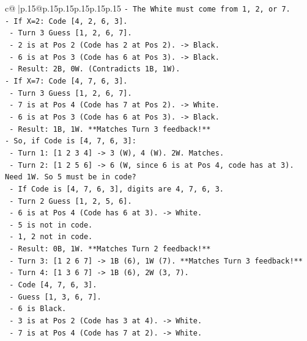 \documentclass{article}
\begin{document}
{\begin{supertabular}{c@{$\;$}|p{.15\linewidth}@{}p{.15\linewidth}p{.15\linewidth}p{.15\linewidth}p{.15\linewidth}p{.15\linewidth}}
{{{\texttt{{-} The White must come from 1, 2, or 7.} \\
\texttt{{-} If X=2: Code {[}4, 2, 6, 3{]}.} \\
\texttt{  {-} Turn 3 Guess {[}1, 2, 6, 7{]}.} \\
\texttt{  {-} 2 is at Pos 2 (Code has 2 at Pos 2). {-}> Black.} \\
\texttt{  {-} 6 is at Pos 3 (Code has 6 at Pos 3). {-}> Black.} \\
\texttt{  {-} Result: 2B, 0W. (Contradicts 1B, 1W).} \\
\texttt{{-} If X=7: Code {[}4, 7, 6, 3{]}.} \\
\texttt{  {-} Turn 3 Guess {[}1, 2, 6, 7{]}.} \\
\texttt{  {-} 7 is at Pos 4 (Code has 7 at Pos 2). {-}> White.} \\
\texttt{  {-} 6 is at Pos 3 (Code has 6 at Pos 3). {-}> Black.} \\
\texttt{  {-} Result: 1B, 1W. **Matches Turn 3 feedback!**} \\
\texttt{{-} So, if Code is {[}4, 7, 6, 3{]}:} \\
\texttt{  {-} Turn 1: {[}1 2 3 4{]} {-}> 3 (W), 4 (W). 2W. Matches.} \\
\texttt{  {-} Turn 2: {[}1 2 5 6{]} {-}> 6 (W, since 6 is at Pos 4, code has at 3). Need 1W. So 5 must be in code?} \\
\texttt{    {-} If Code is {[}4, 7, 6, 3{]}, digits are 4, 7, 6, 3.} \\
\texttt{    {-} Turn 2 Guess {[}1, 2, 5, 6{]}.} \\
\texttt{    {-} 6 is at Pos 4 (Code has 6 at 3). {-}> White.} \\
\texttt{    {-} 5 is not in code.} \\
\texttt{    {-} 1, 2 not in code.} \\
\texttt{    {-} Result: 0B, 1W. **Matches Turn 2 feedback!**} \\
\texttt{  {-} Turn 3: {[}1 2 6 7{]} {-}> 1B (6), 1W (7). **Matches Turn 3 feedback!**} \\
\texttt{  {-} Turn 4: {[}1 3 6 7{]} {-}> 1B (6), 2W (3, 7).} \\
\texttt{    {-} Code {[}4, 7, 6, 3{]}.} \\
\texttt{    {-} Guess {[}1, 3, 6, 7{]}.} \\
\texttt{    {-} 6 is Black.} \\
\texttt{    {-} 3 is at Pos 2 (Code has 3 at 4). {-}> White.} \\
\texttt{    {-} 7 is at Pos 4 (Code has 7 at 2). {-}> White.} \\
}}}
\end{supertabular}}
\end{document}
